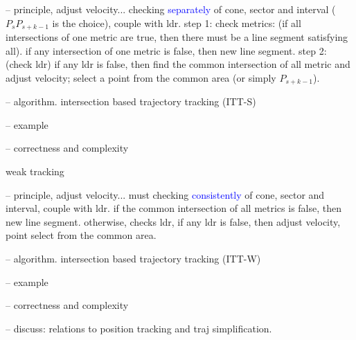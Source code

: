 -- principle, adjust velocity...
	checking \textcolor{blue}{separately} of cone, sector and interval ($P_sP_{s+k-1}$ is the choice), couple with ldr.
	step 1: check metrics: (if all intersections of one metric are true, then there must be a line segment satisfying all).
	if any intersection of one metric is false, then new line segment.
	step 2:	(check ldr) if any ldr is false, then find the common intersection of all metric and adjust velocity; select a point from the common area (or simply $P_{s+k-1}$).

-- algorithm. intersection based trajectory tracking (ITT-S)

-- example

-- correctness and complexity

weak tracking

-- principle, adjust velocity...
	must checking \textcolor{blue}{consistently} of cone, sector and interval, couple with ldr.
	if the common intersection of all metrics is false, then new line segment.
	otherwise, checks ldr, 	if any ldr is false, then adjust velocity, point select from the common area.
	
-- algorithm. intersection based trajectory tracking (ITT-W)

-- example

-- correctness and complexity

-- discuss: relations to position tracking and traj simplification.
